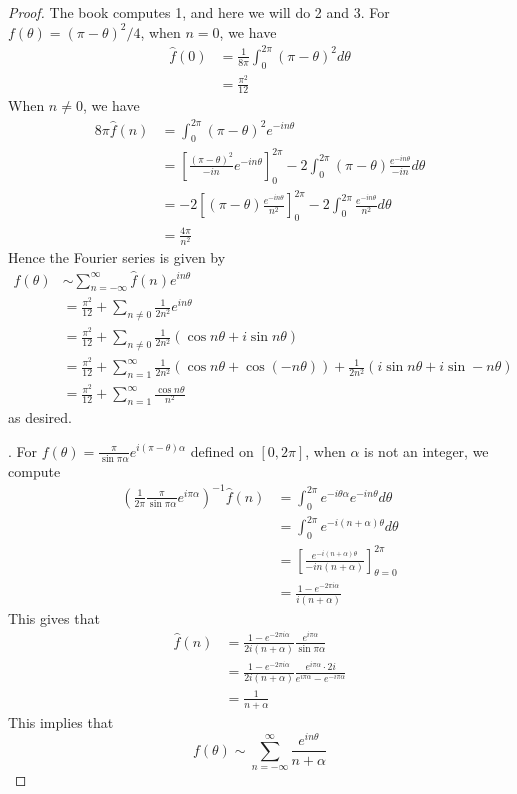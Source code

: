 \begin{proof}
    The book computes 1, and here we will do 2 and 3. For $f(\theta)=(\pi-\theta)^2/4$, when $n=0$, we have
    \begin{align*}
        \hat{f}(0)&=\frac{1}{8\pi}\int_0^{2\pi}(\pi-\theta)^2d\theta\\
        &=\frac{\pi^2}{12}
    \end{align*}
    When $n\neq 0$, we have
    \begin{align*}
        8\pi\hat{f}(n)&=\int_0^{2\pi}(\pi-\theta)^2e^{-in\theta}\\
        &=\left[\frac{(\pi-\theta)^2}{-in}e^{-in\theta}\right]_{0}^{2\pi}-2\int_0^{2\pi}(\pi-\theta)\frac{e^{-in\theta}}{-in}d\theta\\
        &=-2\left[(\pi-\theta)\frac{e^{-in\theta}}{n^2}\right]_0^{2\pi}-2\int_0^{2\pi}\frac{e^{-in\theta}}{n^2}d\theta\\
        &=\frac{4\pi}{n^2}
    \end{align*}
    Hence the Fourier series is given by 
    \begin{align*}
        f(\theta)&\sim \sum_{n=-\infty}^\infty \hat{f}(n)e^{in\theta}\\
        &=\frac{\pi^2}{12}+\sum_{n\neq 0}\frac{1}{2n^2}e^{in\theta}\\
        &=\frac{\pi^2}{12}+\sum_{n\neq 0}\frac{1}{2n^2}(\cos n\theta+i\sin n\theta)\\
        &=\frac{\pi^2}{12}+\sum_{n=1}^\infty \frac{1}{2n^2}\left(\cos n\theta+\cos(-n\theta)\right)+\frac{1}{2n^2}\left(i\sin n\theta+i\sin -n\theta\right)\\
        &=\frac{\pi^2}{12}+\sum_{n=1}^\infty\frac{\cos n\theta}{n^2}
    \end{align*}
    as desired.

    . For $f(\theta)=\frac{\pi}{\sin\pi\alpha}e^{i(\pi-\theta)\alpha}$ defined on $[0,2\pi]$, when $\alpha$ is not an integer, we compute
    \begin{align*}
        \left(\frac{1}{2\pi}\frac{\pi}{\sin\pi\alpha}e^{i\pi\alpha}\right)^{-1}\hat{f}(n)&=\int_0^{2\pi}e^{-i\theta\alpha}e^{-in\theta}d\theta\\
        &=\int_0^{2\pi}e^{-i(n+\alpha)\theta}d\theta\\
        &=\left[\frac{e^{-i(n+\alpha)\theta}}{-in(n+\alpha)}\right]_{\theta=0}^{2\pi}\\
        &=\frac{1-e^{-2\pi i\alpha}}{i(n+\alpha)}
    \end{align*}
    This gives that 
    \begin{align*}
        \hat{f}(n)&=\frac{1-e^{-2\pi i\alpha}}{2i(n+\alpha)}\frac{e^{i\pi\alpha}}{\sin\pi\alpha}\\
        &=\frac{1-e^{-2\pi i\alpha}}{2i(n+\alpha)}\frac{e^{i\pi\alpha}\cdot 2i}{e^{i\pi\alpha}-e^{-i\pi\alpha}}\\
        &=\frac{1}{n+\alpha}
    \end{align*}
    This implies that 
    \begin{equation*}
        f(\theta)\sim\sum_{n=-\infty}^\infty \frac{e^{in\theta}}{n+\alpha}
    \end{equation*}
\end{proof}
